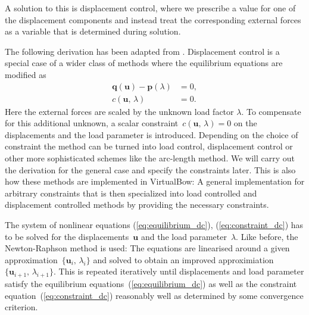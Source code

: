 A solution to this is displacement control, where we prescribe a value for one of the displacement components and instead treat the corresponding external forces as a variable that is determined during solution.

The following derivation has been adapted from \cite{fem_script_uni_bochum}. Displacement control is a special case of a wider class of methods where the equilibrium equations are modified as
%
\begin{align}
\boldsymbol{q}(\boldsymbol{u}) - \boldsymbol{p}(\lambda) &= 0,\label{eq:equilibrium_dc}\\
c(\boldsymbol{u},\,\lambda) &= 0.\label{eq:constraint_dc}
\end{align}
%
Here the external forces are scaled by the unknown load factor $\lambda$. To compensate for this additional unknown, a scalar constraint~$c(\boldsymbol{u},\,\lambda) = 0$ on the displacements and the load parameter is introduced. Depending on the choice of constraint the method can be turned into load control, displacement control or other more sophisticated schemes like the arc-length method. We will carry out the derivation for the general case and specify the constraints later. This is also how these methods are implemented in VirtualBow: A general implementation for arbitrary constraints that is then specialized into load controlled and displacement controlled methods by providing the necessary constraints.

The system of nonlinear equations (\ref{eq:equilibrium_dc}), (\ref{eq:constraint_dc}) has to be solved for the displacements~$\boldsymbol{u}$ and the load parameter~$\lambda$. Like before, the Newton-Raphson method is used: The equations are linearised around a given approximation~$\{\boldsymbol{u}_i,\,\lambda_i\}$ and solved to obtain an improved approximiation~$\{\boldsymbol{u}_{i+1},\,\lambda_{i+1}\}$. This is repeated iteratively until displacements and load parameter satisfy the equilibrium equations~(\ref{eq:equilibrium_dc}) as well as the constraint equation~(\ref{eq:constraint_dc}) reasonably well as determined by some convergence criterion.

